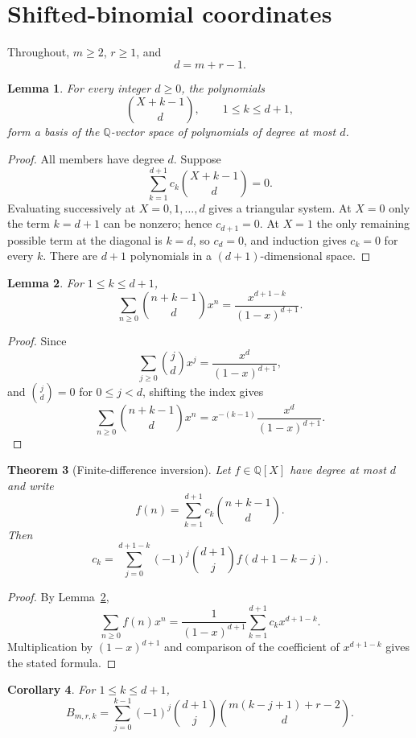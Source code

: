 \documentclass[11pt]{article}
\newtheorem{theorem}{Theorem}[section]
\newtheorem{lemma}[theorem]{Lemma}
\newtheorem{corollary}[theorem]{Corollary}
\theoremstyle{definition}
\theoremstyle{remark}
\newcommand{\Q}{\mathbb Q}
\begin{document}
\section{Shifted-binomial coordinates}
\label{sec:expansion}

Throughout, $m\ge2$, $r\ge1$, and
\[
 d=m+r-1.
\]

\begin{lemma}
\label{lem:basis}
For every integer $d\ge0$, the polynomials
\[
 \binom{X+k-1}{d},\qquad 1\le k\le d+1,
\]
form a basis of the $\Q$-vector space of polynomials of degree at most $d$.
\end{lemma}

\begin{proof}
All members have degree $d$. Suppose
\[
 \sum_{k=1}^{d+1}c_k\binom{X+k-1}{d}=0.
\]
Evaluating successively at $X=0,1,\ldots,d$ gives a triangular system.
At $X=0$ only the term $k=d+1$ can be nonzero; hence $c_{d+1}=0$.
At $X=1$ the only remaining possible term at the diagonal is $k=d$,
so $c_d=0$, and induction gives $c_k=0$ for every $k$.
There are $d+1$ polynomials in a $(d+1)$-dimensional space.
\end{proof}

\begin{lemma}
\label{lem:gf}
For $1\le k\le d+1$,
\[
 \sum_{n\ge0}\binom{n+k-1}{d}x^n
 =
 \frac{x^{d+1-k}}{(1-x)^{d+1}}.
\]
\end{lemma}

\begin{proof}
Since
\[
 \sum_{j\ge0}\binom{j}{d}x^j
 =
 \frac{x^d}{(1-x)^{d+1}},
\]
and $\binom{j}{d}=0$ for $0\le j<d$, shifting the index gives
\[
 \sum_{n\ge0}\binom{n+k-1}{d}x^n
 =
 x^{-(k-1)}\frac{x^d}{(1-x)^{d+1}}.
\]
\end{proof}

\begin{theorem}[Finite-difference inversion]
\label{thm:inversion}
Let $f\in\Q[X]$ have degree at most $d$ and write
\[
 f(n)=\sum_{k=1}^{d+1}c_k\binom{n+k-1}{d}.
\]
Then
\[
 c_k
 =
 \sum_{j=0}^{d+1-k}
 (-1)^j\binom{d+1}{j}f(d+1-k-j).
\]
\end{theorem}

\begin{proof}
By Lemma~\ref{lem:gf},
\[
 \sum_{n\ge0}f(n)x^n
 =
 \frac{1}{(1-x)^{d+1}}
 \sum_{k=1}^{d+1}c_kx^{d+1-k}.
\]
Multiplication by $(1-x)^{d+1}$ and comparison of the coefficient of
$x^{d+1-k}$ gives the stated formula.
\end{proof}

\begin{corollary}
\label{cor:closed}
For $1\le k\le d+1$,
\begin{equation}
\label{eq:closed}
 B_{m,r,k}
 =
 \sum_{j=0}^{k-1}
 (-1)^j\binom{d+1}{j}
 \binom{m(k-j+1)+r-2}{d}.
\end{equation}
\end{corollary}
\end{document}
